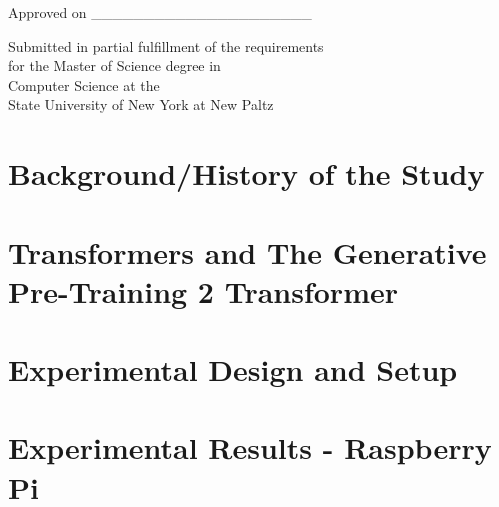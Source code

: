 \documentclass[english]{report}
\begin{document}
\begin{flushright}
	Approved on \_\_\_\_\_\_\_\_\_\_\_\_\_\_\_\_\_\_\_\_\_
\end{flushright}

\vspace{1cm}

\begin{center}
	Submitted in partial fulfillment of the requirements \\
	for the Master of Science degree in \\
	Computer Science at the \\
	State University of New York at New Paltz \\
\end{center}


\newpage



\vspace{5mm}


\newpage

\tableofcontents

\newpage

\listoffigures
\listoftables



\newpage
{}

	


\chapter{Background/History of the Study}



\chapter{Transformers and The Generative Pre-Training 2 Transformer}



\chapter{Experimental Design and Setup}



\chapter{Experimental Results - Raspberry Pi}
\end{document}
